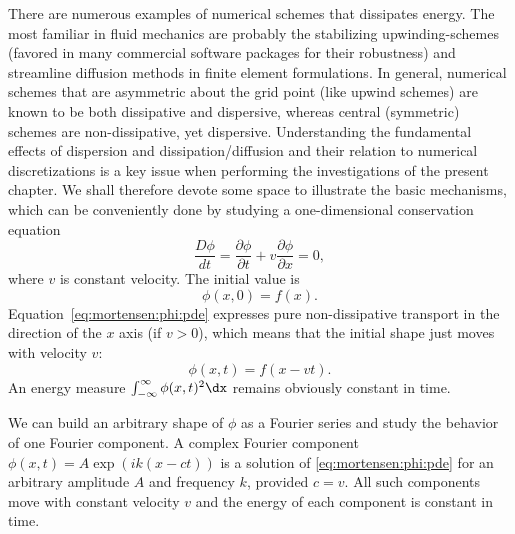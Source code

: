 There are numerous examples of numerical schemes that dissipates
energy. The most familiar in fluid mechanics are probably the stabilizing
upwinding-schemes (favored in many commercial software packages for
their robustness) and streamline diffusion methods in finite element
formulations. In general, numerical schemes that are asymmetric about
the grid point (like upwind schemes) are known to be both dissipative
and dispersive, whereas central (symmetric) schemes are non-dissipative,
yet dispersive. Understanding the fundamental effects of dispersion and
dissipation/diffusion and their relation to numerical discretizations is
a key issue when performing the investigations of the present chapter. We
shall therefore devote some space to illustrate the basic mechanisms,
which can be conveniently done by studying a one-dimensional conservation
equation
\begin{equation}
\frac{D\phi}{dt}
 = \frac{\partial\phi}{\partial t} + v\frac{\partial\phi}{\partial x}
  = 0,
\label{eq:mortensen:phi:pde}
\end{equation}
where $v$ is constant velocity. The initial value is
\begin{equation}
  \phi(x,0)=f(x).
\end{equation}
Equation~\eqref{eq:mortensen:phi:pde} expresses pure non-dissipative transport
in the direction of the $x$ axis (if $v>0$), which means that the initial
shape just moves with velocity $v$:
\begin{equation}
 \phi(x,t) = f(x-vt).
\end{equation}
An energy measure $\int_{-\infty}^\infty\phi(x,t)^2\dx$ remains
obviously constant in time.

We can build an arbitrary shape of $\phi$ as a Fourier series and
study the behavior of one Fourier component.  A complex Fourier
component $\phi (x,t)=A\exp{(ik(x - ct))}$ is a solution of
\eqref{eq:mortensen:phi:pde} for an arbitrary amplitude $A$ and
frequency $k$, provided $c = v$.  All such components move with
constant velocity $v$ and the energy of each component is constant in
time.

